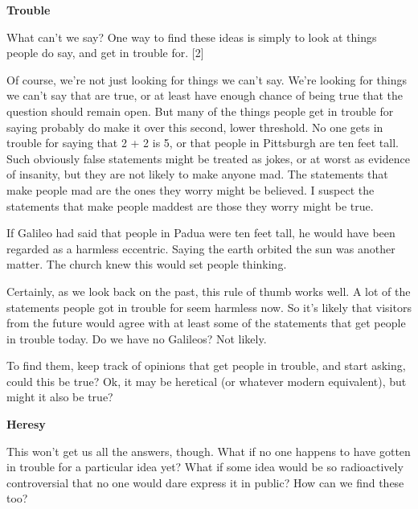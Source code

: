 \textbf{Trouble}

What can't we say? One way to find these ideas is
                  simply to look at things people do say, and get in trouble
                  for. [2]

Of course, we're not just looking for
                  things we can't say. We're looking for things we can't say
                  that are true, or at least have enough chance of being true
                  that the question should remain open. But many of the things
                  people get in trouble for saying probably do make it over this
                  second, lower threshold. No one gets in trouble for saying
                  that 2 + 2 is 5, or that people in Pittsburgh are ten feet
                  tall. Such obviously false statements might be treated as
                  jokes, or at worst as evidence of insanity, but they are not
                  likely to make anyone mad. The statements that make people mad
                  are the ones they worry might be believed. I suspect the
                  statements that make people maddest are those they worry might
                  be true.

If Galileo had said that people in Padua
                  were ten feet tall, he would have been regarded as a harmless
                  eccentric. Saying the earth orbited the sun was another
                  matter. The church knew this would set people thinking.

Certainly,
                  as we look back on the past, this rule of thumb works well. A
                  lot of the statements people got in trouble for seem harmless
                  now. So it's likely that visitors from the future would agree
                  with at least some of the statements that get people in
                  trouble today. Do we have no Galileos? Not likely.

To
                  find them, keep track of opinions that get people in trouble,
                  and start asking, could this be true? Ok, it may be heretical
                  (or whatever modern equivalent), but might it also be true?

\textbf{Heresy}

This won't get us all the answers, though. What
                  if no one happens to have gotten in trouble for a particular
                  idea yet? What if some idea would be so radioactively
                  controversial that no one would dare express it in public? How
                  can we find these too?


